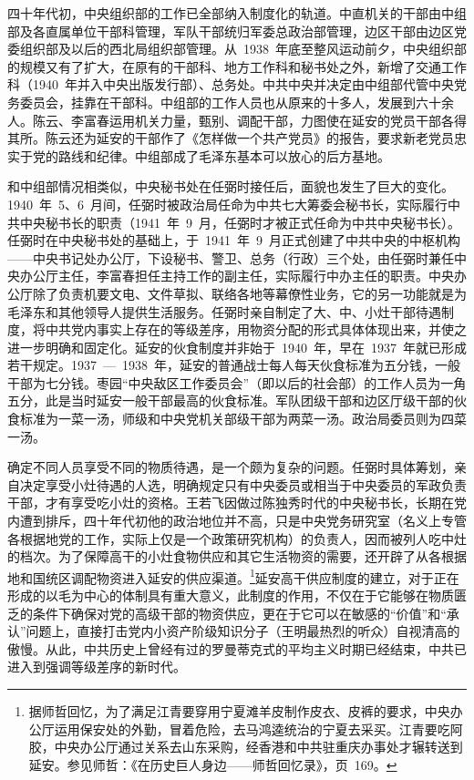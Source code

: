 四十年代初，中央组织部的工作已全部纳入制度化的轨道。中直机关的干部由中组部及各直属单位干部科管理，军队干部统归军委总政治部管理，边区干部由边区党委组织部及以后的西北局组织部管理。从~1938~年底至整风运动前夕，中央组织部的规模又有了扩大，在原有的干部科、地方工作科和秘书处之外，新增了交通工作科（1940~年并入中央出版发行部）、总务处。中共中央并决定由中组部代管中央党务委员会，挂靠在干部科。中组部的工作人员也从原来的十多人，发展到六十余人。陈云、李富春运用机关力量，甄别、调配干部，力图使在延安的党员干部各得其所。陈云还为延安的干部作了《怎样做一个共产党员》的报告，要求新老党员忠实于党的路线和纪律。中组部成了毛泽东基本可以放心的后方基地。

和中组部情况相类似，中央秘书处在任弼时接任后，面貌也发生了巨大的变化。1940~年~5、6~月间，任弼时被政治局任命为中共七大筹委会秘书长，实际履行中共中央秘书长的职责（1941~年~9~月，任弼时才被正式任命为中共中央秘书长）。任弼时在中央秘书处的基础上，于~1941~年~9~月正式创建了中共中央的中枢机构——中央书记处办公厅，下设秘书、警卫、总务（行政）三个处，由任弼时兼任中央办公厅主任，李富春担任主持工作的副主任，实际履行中办主任的职责。中央办公厅除了负责机要文电、文件草拟、联络各地等幕僚性业务，它的另一功能就是为毛泽东和其他领导人提供生活服务。任弼时亲自制定了大、中、小灶干部待遇制度，将中共党内事实上存在的等级差序，用物资分配的形式具体体现出来，并使之进一步明确和固定化。延安的伙食制度并非始于~1940~年，早在~1937~年就已形成若干规定。1937~—~1938~年，延安的普通战士每人每天伙食标准为五分钱，一般干部为七分钱。枣园“中央敌区工作委员会”（即以后的社会部）的工作人员为一角五分，此是当时延安一般干部最高的伙食标准。军队团级干部和边区厅级干部的伙食标准为一菜一汤，师级和中央党机关部级干部为两菜一汤。政治局委员则为四菜一汤。

确定不同人员享受不同的物质待遇，是一个颇为复杂的问题。任弼时具体筹划，亲自决定享受小灶待遇的人选，明确规定只有中央委员或相当于中央委员的军政负责干部，才有享受吃小灶的资格。王若飞因做过陈独秀时代的中央秘书长，长期在党内遭到排斥，四十年代初他的政治地位并不高，只是中央党务研究室（名义上专管各根据地党的工作，实际上仅是一个政策研究机构）的负责人，因而被列人吃中灶的档次。为了保障高干的小灶食物供应和其它生活物资的需要，还开辟了从各根据地和国统区调配物资进入延安的供应渠道。\footnote{据师哲回忆，为了满足江青要穿用宁夏滩羊皮制作皮衣、皮裤的要求，中央办公厅运用保安处的外勤，冒着危险，去马鸿逵统治的宁夏去采买。江青要吃阿胶，中央办公厅通过关系去山东采购，经香港和中共驻重庆办事处才辗转送到延安。参见师哲：《在历史巨人身边——师哲回忆录》，页~169。}延安高干供应制度的建立，对于正在形成的以毛为中心的体制具有重大意义，此制度的作用，不仅在于它能够在物质匮乏的条件下确保对党的高级干部的物资供应，更在于它可以在敏感的“价值”和“承认”问题上，直接打击党内小资产阶级知识分子（王明最热烈的听众）自视清高的傲慢。从此，中共历史上曾经有过的罗曼蒂克式的平均主义时期已经结束，中共已进入到强调等级差序的新时代。

